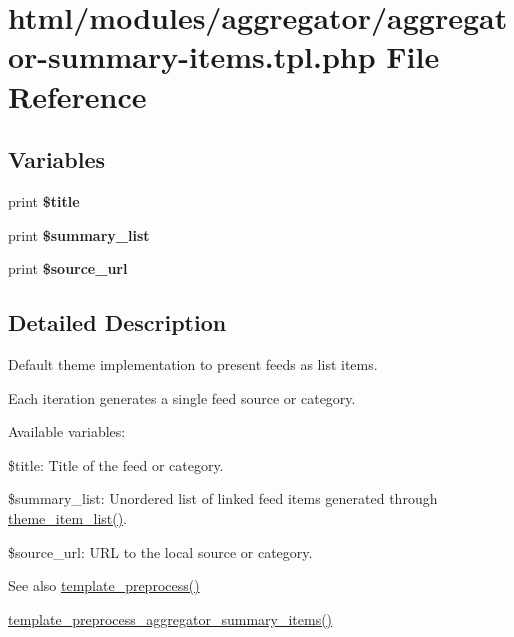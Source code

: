 \hypertarget{aggregator-summary-items_8tpl_8php}{
\section{html/modules/aggregator/aggregator-\/summary-\/items.tpl.php File Reference}
\label{aggregator-summary-items_8tpl_8php}
}
\subsection*{Variables}
\begin{DoxyCompactItemize}
\item 
\hypertarget{aggregator-summary-items_8tpl_8php_aec2795512d255332f57cacd930a090b4}{
print {\bfseries \$title}}
\label{aggregator-summary-items_8tpl_8php_aec2795512d255332f57cacd930a090b4}

\item 
\hypertarget{aggregator-summary-items_8tpl_8php_a5411b138c200de3cea9a4d1dc628dc18}{
print {\bfseries \$summary\_\-list}}
\label{aggregator-summary-items_8tpl_8php_a5411b138c200de3cea9a4d1dc628dc18}

\item 
\hypertarget{aggregator-summary-items_8tpl_8php_ac28b1457ba0a04cbe629056c40639fd5}{
print {\bfseries \$source\_\-url}}
\label{aggregator-summary-items_8tpl_8php_ac28b1457ba0a04cbe629056c40639fd5}

\end{DoxyCompactItemize}


\subsection{Detailed Description}
Default theme implementation to present feeds as list items.

Each iteration generates a single feed source or category.

Available variables:
\begin{DoxyItemize}
\item \$title: Title of the feed or category.
\item \$summary\_\-list: Unordered list of linked feed items generated through \hyperlink{group__themeable_ga515afdc4832483a813cd09ba4786fdfe}{theme\_\-item\_\-list()}.
\item \$source\_\-url: URL to the local source or category.
\end{DoxyItemize}

\begin{DoxySeeAlso}{See also}
\hyperlink{includes_2theme_8inc_a3eeb7bcdba7ef4859f99586da264d347}{template\_\-preprocess()} 

\hyperlink{aggregator_8pages_8inc_af80643fa6f8b742a431aed61576606dd}{template\_\-preprocess\_\-aggregator\_\-summary\_\-items()} 
\end{DoxySeeAlso}
